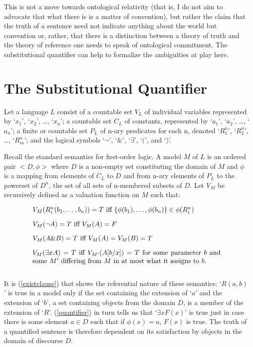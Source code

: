 \documentclass[12pt,a4paper]{article}
\newenvironment{te}
{\begin{singlespace}
\begin{equation}
\begin{minipage}[t]{0.8\linewidth}}
{\end{minipage}
\end{equation}
\end{singlespace}
\ignorespacesafterend}
\begin{document}
This is not a move towards ontological relativity (that is, I do not
aim to advocate that what there is is a matter of convention), but
rather the claim that the truth of a sentence need not indicate
anything about the world but convention or, rather, that there is a
distinction between a theory of truth and the theory of reference one
needs to speak of ontological commitment.  The substitutional
quantifier can help to formalize the ambiguities at play here.


\section{The Substitutional Quantifier} 

Let a language $L$ consist of a countable set $V_L$ of individual
variables represented by `$x_1$', `$x_2$', \ldots, `$x_n$'; a
countable set $C_L$ of constants, represented by `$a_1$', `$a_2$',
\ldots, `$a_n$'; a finite or countable set $P_L$ of n-ary predicates for
each n, denoted `$R^n_1$', `$R^n_2$', \ldots, `$R^n_m$'; and the
logical symbols `$\neg$', `$\&$', `$\exists$', `$($', and `$)$'.

Recall the standard semantics for first-order logic.  A model $M$ of
$L$ is an ordered pair $<D,\phi>$ where $D$ is a non-empty set
constituting the domain of $M$ and $\phi$ is a mapping from elements
of $C_L$ to $D$ and from n-ary elements of $P_L$ to the powerset of $D^n$,
the set of all sets of n-membered subsets of $D$.  Let $V_M$ be
recursively defined as a valuation function on $M$ such that:

\begin{te}
  $V_M(R^n_i(b_1,\ldots ,b_n)) = T$ iff $\{ \phi(b_1),\ldots ,\phi(b_n) \} \in
  \phi(R^n_i)$
\label{existclause}
\end{te}

\begin{te}
  $V_M(\neg A) = T$ iff $V_M(A) = F$
\end{te}

\begin{te}
  $V_M(A \& B) = T$ iff $V_M(A) = V_M(B) = T$
\end{te}

\begin{te}
  $V_M(\exists xA) = T$ iff $V_{M'}(A[b/x]) = T$ for some
  parameter $b$ and some $M'$ differing from $M$ in at most what it
  assigns to $b$.\\
\label{quantifier}
\end{te}

It is (\ref{existclause}) that shows the referential nature of these
semantics: `$R(a,b)$' is true in a model only if the set containing the
extension of `$a$' and the extension of `$b$', a set containing objects
from the domain $D$, is a member of the extension of
`$R$'. (\ref{quantifier}) in turn tells us that `$\exists xF(x)$' is true
just in case there is some element $a \in D$ such that if $\phi(x) =
{a}$, $F(x)$ is true.  The truth of a quantified sentence is therefore
dependent on its satisfaction by objects in the domain of discourse $D$.
\end{document}
